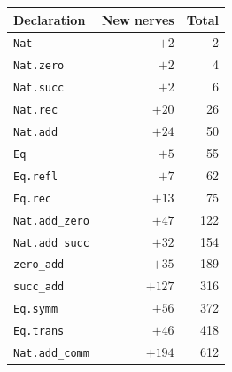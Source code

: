 \begin{tabular}{@{}lrr@{}}
\toprule
Declaration & New nerves & Total \\
\midrule
\texttt{Nat} & $+2$ & 2 \\
\texttt{Nat.zero} & $+2$ & 4 \\
\texttt{Nat.succ} & $+2$ & 6 \\
\texttt{Nat.rec} & $+20$ & 26 \\
\texttt{Nat.add} & $+24$ & 50 \\
\texttt{Eq} & $+5$ & 55 \\
\texttt{Eq.refl} & $+7$ & 62 \\
\texttt{Eq.rec} & $+13$ & 75 \\
\texttt{Nat.add\_zero} & $+47$ & 122 \\
\texttt{Nat.add\_succ} & $+32$ & 154 \\
\texttt{zero\_add} & $+35$ & 189 \\
\texttt{succ\_add} & $+127$ & 316 \\
\texttt{Eq.symm} & $+56$ & 372 \\
\texttt{Eq.trans} & $+46$ & 418 \\
\texttt{Nat.add\_comm} & $+194$ & 612 \\
\bottomrule
\end{tabular}
